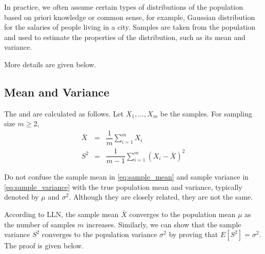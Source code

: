 In practice, we often assume certain types of distributions of the population based on priori knowledge or common sense, for example, Gaussian distribution for the salaries of people living in a city. Samples are taken from the population and used to estimate the properties of the distribution, such as its mean and variance.

More details are given below.

\subsection{Mean and Variance}

The  and  are calculated as follows. Let $X_1, \ldots, X_m$ be the samples. For sampling size $m\geq 2$,
\begin{eqnarray}
	\bar{X} &=& \dfrac{1}{m}\sum_{i=1}^{m}X_i \label{eq:sample_mean} \\
	S^2 &=& \dfrac{1}{m-1}\sum_{i=1}^{m}\left(X_i - \bar{X}\right)^2 \label{eq:sample_variance}
\end{eqnarray}

Do not confuse the sample mean in \eqref{eq:sample_mean} and sample variance in \eqref{eq:sample_variance} with the true population mean and variance, typically denoted by $\mu$ and $\sigma^2$. Although they are closely related, they are not the same.

According to LLN, the sample mean $\bar{X}$ converges to the population mean $\mu$ as the number of samples $m$ increases. Similarly, we can show that the sample variance $S^2$ converges to the population variance $\sigma^2$ by proving that $E[S^2] = \sigma^2$. The proof is given below.

